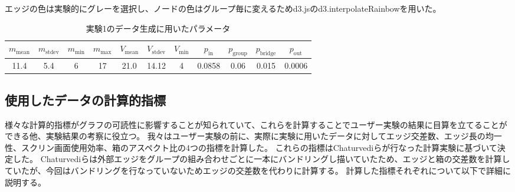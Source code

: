 \documentclass{kuee}
\begin{document}
エッジの色は実験的にグレーを選択し、ノードの色はグループ毎に変えるためd3.js\cite{Bostock:2011:DDD:2068462.2068631}のd3.interpolateRainbowを用いた。


\begin{table}[b]
  \begin{center}
  \caption{実験1のデータ生成に用いたパラメータ}
  \label{tab:parameters}
  \begin{tabular}{|c|c|c|c|c|c|c|c|c|c|c|} \hline
  $m_{\text{mean}}$ & $m_{\text{stdev}}$ & $m_{\text{min}}$ & $m_{\text{max} }$ & $V_{\text{mean}}$ & $V_{\text{stdev}}$ & $V_{\text{min}}$ & $p_{\text{in}}$ & $p_{\text{group}}$ & $p_{\text{bridge}}$ & $p_{\text{out}}$ \\ \hline
  11.4 & 5.4 & 6 & 17 & 21.0 & 14.12 & 4 & 0.0858 & 0.06 & 0.015 & 0.0006\\ \hline
  \end{tabular}
  \end{center}
\end{table}

\subsection{使用したデータの計算的指標}
\label{subsec:metric_of_data}

様々な計算的指標がグラフの可読性に影響することが知られていて、これらを計算することでユーザー実験の結果に目算を立てることができる他、実験結果の考察に役立つ。
我々はユーザー実験の前に、実際に実験に用いたデータに対してエッジ交差数、エッジ長の均一性、スクリン画面使用効率、箱のアスペクト比の4つの指標を計算した。
これらの指標はChaturvediらが行なった計算実験\cite{chaturvedi2014group}に基づいて決定した。
Chaturvediらは外部エッジをグループの組み合わせごとに一本にバンドリングし描いていたため、エッジと箱の交差数を計算していたが、今回はバンドリングを行なっていないためエッジの交差数を代わりに計算する。
計算した指標それぞれについて以下で詳細に説明する。
\end{document}
